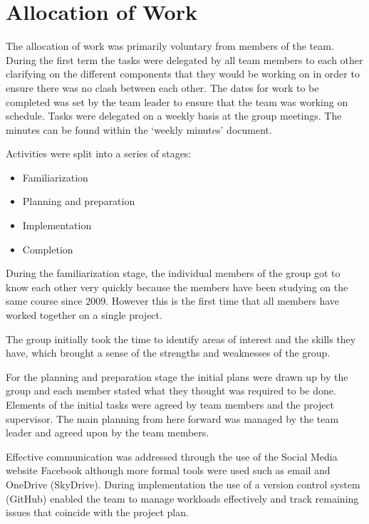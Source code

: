 \section{Allocation of Work}
\label{sec:allocation_of_work}

The allocation of work was primarily voluntary from members of the team. During
the first term the tasks were delegated by all team members to each other
clarifying on the different components that they would be working on in order to
ensure there was no clash between each other. The dates for work to be completed
was set by the team leader to ensure that the team was working on schedule.
Tasks were delegated on a weekly basis at the group meetings. The minutes can be
found within the `weekly minutes' document.

Activities were split into a series of stages:

\begin{itemize}
  \item Familiarization
  \item Planning and preparation
  \item Implementation
  \item Completion
\end{itemize}

During the familiarization stage, the individual members of the group got to
know each other very quickly because the members have been studying on the same
course since 2009. However this is the first time that all members have worked
together on a single project.

The group initially took the time to identify areas of interest and the skills
they have, which brought a sense of the strengths and weaknesses of the group.

For the planning and preparation stage the initial plans were drawn up by the
group and each member stated what they thought was required to be done. Elements
of the initial tasks were agreed by team members and the project supervisor. The
main planning from here forward was managed by the team leader and agreed upon
by the team members.

Effective communication was addressed through the use of the Social Media
website Facebook although more formal tools were used such as email and
OneDrive (SkyDrive). During implementation the use of a version control system
(GitHub) enabled the team to manage workloads effectively and track remaining
issues that coincide with the project plan.

